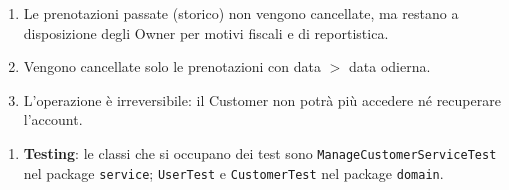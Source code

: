 \documentclass{article}
\begin{document}
	{
		\begin{enumerate}[nosep, leftmargin=*]
			\item[•] Le prenotazioni passate (storico) non vengono cancellate, ma restano a disposizione degli Owner per motivi fiscali e di reportistica.
			\item[•] Vengono cancellate solo le prenotazioni con data $>$ data odierna.
			\item[•] L'operazione è irreversibile: il Customer non potrà più accedere né recuperare l'account.
		\end{enumerate}
		
		\begin{enumerate}[leftmargin=*]
			\item[•] \textbf{Testing}: le classi che si occupano dei test sono \texttt{ManageCustomerServiceTest} nel package \texttt{service}; \texttt{UserTest} e \texttt{CustomerTest} nel package \texttt{domain}.
		\end{enumerate}
	}
		
	\newpage
	
\end{document}
